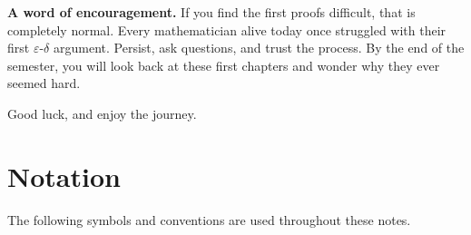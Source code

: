 \documentclass[12pt,a4paper,openany]{book}
\newcommand{\eps}{\varepsilon}
\theoremstyle{definition}
\theoremstyle{remark}
\begin{document}
\medskip

\textbf{A word of encouragement.}\quad
If you find the first proofs difficult, that is completely normal.  Every
mathematician alive today once struggled with their first $\eps$-$\delta$
argument.  Persist, ask questions, and trust the process.  By the end of the
semester, you will look back at these first chapters and wonder why they ever
seemed hard.

\medskip

Good luck, and enjoy the journey.

\chapter*{Notation}

The following symbols and conventions are used throughout these notes.

\bigskip
\end{document}
